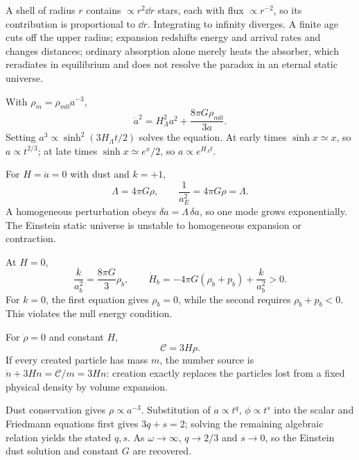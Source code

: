 \begin{solutions}

\begin{solution}
A shell of radius \(r\) contains \(\propto r^2\dd r\) stars, each with flux
\(\propto r^{-2}\), so its contribution is proportional to \(\dd r\).
Integrating to infinity diverges.  A finite age cuts off the upper radius;
expansion redshifts energy and arrival rates and changes distances; ordinary
absorption alone merely heats the absorber, which reradiates in equilibrium
and does not resolve the paradox in an eternal static universe.
\end{solution}

\begin{solution}
With \(\rho_m=\rho_{m0}a^{-3}\),
\[
\dot a^2=H_\Lambda^2a^2+\frac{8\pi G\rho_{m0}}{3a}.
\]
Setting \(a^3\propto\sinh^2(3H_\Lambda t/2)\) solves the equation.  At early
times \(\sinh x\simeq x\), so \(a\propto t^{2/3}\); at late times
\(\sinh x\simeq e^x/2\), so \(a\propto e^{H_\Lambda t}\).
\end{solution}

\begin{solution}
For \(H=\ddot a=0\) with dust and \(k=+1\),
\[
\Lambda=4\pi G\rho,\qquad
\frac1{a_E^2}=4\pi G\rho=\Lambda.
\]
A homogeneous perturbation obeys
\(\delta\ddot a=\Lambda\,\delta a\), so one mode grows exponentially.  The
Einstein static universe is unstable to homogeneous expansion or contraction.
\end{solution}

\begin{solution}
At \(H=0\),
\[
\frac{k}{a_b^2}=\frac{8\pi G}{3}\rho_b,\qquad
\dot H_b=-4\pi G(\rho_b+p_b)+\frac{k}{a_b^2}>0.
\]
For \(k=0\), the first equation gives \(\rho_b=0\), while the second requires
\(\rho_b+p_b<0\).  This violates the null energy condition.
\end{solution}

\begin{solution}
For \(\dot\rho=0\) and constant \(H\),
\[
\mathcal C=3H\rho.
\]
If every created particle has mass \(m\), the number source is
\(\dot n+3Hn=\mathcal C/m=3Hn\): creation exactly replaces the particles
lost from a fixed physical density by volume expansion.
\end{solution}

\begin{solution}
Dust conservation gives \(\rho\propto a^{-3}\).  Substitution of
\(a\propto t^q\), \(\phi\propto t^s\) into the scalar and Friedmann equations
first gives \(3q+s=2\); solving the remaining algebraic relation yields the
stated \(q,s\).  As \(\omega\to\infty\), \(q\to2/3\) and \(s\to0\), so the
Einstein dust solution and constant \(G\) are recovered.
\end{solution}


\end{solutions}
